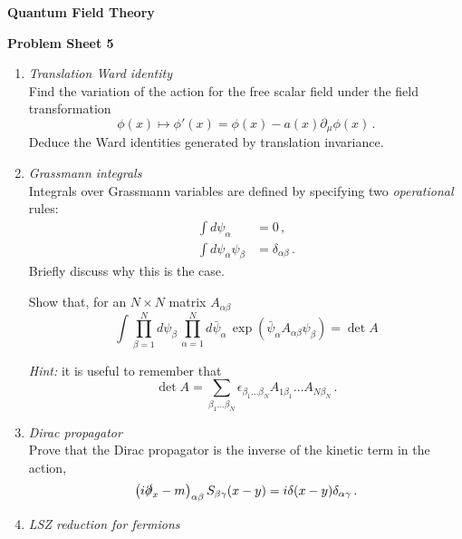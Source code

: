 \documentclass[12pt,a4paper]{article}
\newcommand{\psibar}{\bar{\psi}}
\begin{document}
\begin{center}
\textbf{ Quantum Field Theory}\\[\baselineskip]
\end{center}
\textbf{ Problem Sheet 5}

\begin{enumerate}
  \item \emph{ Translation Ward identity} \\
    
    Find the variation of the action for the free scalar field under
    the field transformation
    \[
    \phi(x) \mapsto \phi'(x) = \phi(x) - a(x) \partial_\mu \phi(x)\, .
    \]
    Deduce the Ward identities generated by translation invariance. 

    \bigskip
    
  \item \emph{ Grassmann integrals}\\

    Integrals over Grassmann variables are defined by specifying two
    {\em operational} rules:
    \begin{align}
      \int d\psi_\alpha &= 0\, , \nonumber \\
      \int d\psi_\alpha \psi_\beta &= \delta_{\alpha\beta}\, . \nonumber
    \end{align}
    Briefly discuss why this is the case.

    Show that, for an $N\times N$ matrix $A_{\alpha\beta}$ 
    \[
    \int \prod_{\beta=1}^N d\psi_\beta\,
    \prod_{\alpha=1}^N d\psibar_\alpha\,
    \exp\left(
      \psibar_\alpha A_{\alpha\beta} \psi_\beta
      \right) = \det A
    \]
    
    {\em Hint:} it is useful to remember that 
    \[
    \det A = \sum_{\beta_1\ldots \beta_N} 
    \epsilon_{\beta_1\ldots\beta_N} 
    A_{1\beta_1} \ldots A_{N\beta_N}\, .
    \]

    \bigskip

    \item \emph{ Dirac propagator} \\
      
      Prove that the Dirac propagator is the inverse of the kinetic
      term in the action, \ie
      \[
      \left(i \slashed{\partial}_x -m \right)_{\alpha\beta}
      S_{\beta\gamma}(x-y) = i \delta(x-y) \delta_{\alpha\gamma}\, .
      \]

  \item \emph{ LSZ reduction for fermions}\\
    

\end{enumerate}
\end{document}
